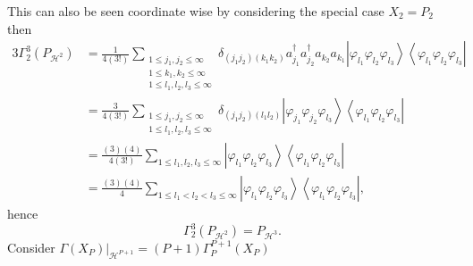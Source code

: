 \documentclass[aps,preprint]{revtex4}%
\begin{document}
This can also be seen coordinate wise by considering the special case
$X_{2}=P_{2}$ then
\begin{align}
3\Gamma_{2}^{3}\left(  P_{\mathcal{H}^{2}}\right)   &  =\frac{1}{4\left(
3!\right)  }\sum_{\substack{1\leq j_{1},j_{2}\leq\infty\\1\leq k_{1},k_{2}%
\leq\infty\\1\leq l_{1},l_{2},l_{3}\leq\infty}}\delta_{\left(  j_{1}%
j_{2}\right)  \left(  k_{1}k_{2}\right)  }a_{j_{1}}^{\dagger}a_{j_{2}%
}^{\dagger}a_{k_{2}}a_{k_{1}}\left\vert \varphi_{l_{1}}\varphi_{l_{2}}%
\varphi_{l_{3}}\right\rangle \left\langle \varphi_{l_{1}}\varphi_{l_{2}%
}\varphi_{l_{3}}\right\vert \\
&  =\frac{3}{4\left(  3!\right)  }\sum_{\substack{1\leq j_{1},j_{2}\leq
\infty\\1\leq l_{1},l_{2},l_{3}\leq\infty}}\delta_{\left(  j_{1}j_{2}\right)
\left(  l_{1}l_{2}\right)  }\left\vert \varphi_{j_{1}}\varphi_{j_{2}}%
\varphi_{l_{3}}\right\rangle \left\langle \varphi_{l_{1}}\varphi_{l_{2}%
}\varphi_{l_{3}}\right\vert \\
&  =\frac{\left(  3\right)  \left(  4\right)  }{4\left(  3!\right)  }%
\sum_{1\leq l_{1},l_{2},l_{3}\leq\infty}\left\vert \varphi_{l_{1}}%
\varphi_{l_{2}}\varphi_{l_{3}}\right\rangle \left\langle \varphi_{l_{1}%
}\varphi_{l_{2}}\varphi_{l_{3}}\right\vert \\
&  =\frac{\left(  3\right)  \left(  4\right)  }{4}\sum_{1\leq l_{1}%
<l_{2}<l_{3}\leq\infty}\left\vert \varphi_{l_{1}}\varphi_{l_{2}}\varphi
_{l_{3}}\right\rangle \left\langle \varphi_{l_{1}}\varphi_{l_{2}}%
\varphi_{l_{3}}\right\vert ,
\end{align}
hence%
\begin{equation}
\Gamma_{2}^{3}\left(  P_{\mathcal{H}^{2}}\right)  =P_{\mathcal{H}^{3}}.
\end{equation}
Consider $\left.  \Gamma\left(  X_{P}\right)  \right\vert _{\mathcal{H}^{P+1}%
}=\left(  P+1\right)  \Gamma_{P}^{P+1}\left(  X_{P}\right)  $
\end{document}
